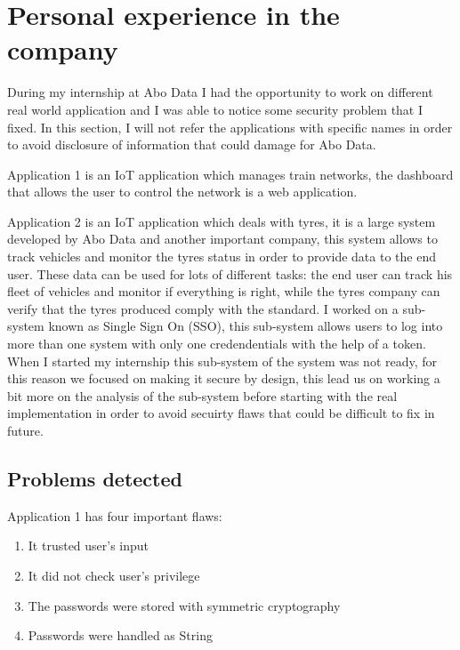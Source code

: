 

\section{Personal experience in the company}

During my internship at Abo Data I had the opportunity to work on different real world application and I was able to notice some security problem that I fixed.\newline
In this section, I will not refer the applications with specific names in order to avoid disclosure of information that could damage for Abo Data.

Application 1 is an IoT application which manages train networks, the dashboard that allows the user to control the network
is a web application.\newline

Application 2 is an IoT application which deals with tyres, it is a large system developed by Abo Data and another important company, 
this system allows to track vehicles and monitor the tyres status in order to provide data to the end user.\newline
These data can be used for lots of different tasks: the end user can track his fleet of vehicles and monitor if everything is right, while
the tyres company can verify that the tyres produced comply with the standard.\newline
I worked on a sub-system known as Single Sign On (SSO), this sub-system allows users to log into more than one system
with only one credendentials with the help of a token.\newline
When I started my internship this sub-system of the system was not ready, for this reason we focused on making it secure by design, this lead us on working a bit more on the analysis of the sub-system before starting with the real implementation in order to avoid secuirty flaws that could be difficult to fix in future.\newline


\subsection{Problems detected}
Application 1 has four important flaws:
\begin{enumerate}
	\item It trusted user’s input
	\item It did not check user’s privilege
	\item The passwords were stored with symmetric cryptography
	\item Passwords were handled as String
\end{enumerate}

